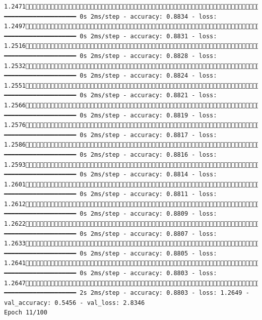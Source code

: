 \documentclass[
  letterpaper,
  DIV=11,
  numbers=noendperiod]{scrartcl}
\begin{document}
\begin{verbatim}
1.2471461/858 ━━━━━━━━━━━━━━━━━━━━ 0s 2ms/step - accuracy: 0.8834 - loss: 1.2497488/858 ━━━━━━━━━━━━━━━━━━━━ 0s 2ms/step - accuracy: 0.8831 - loss: 1.2516514/858 ━━━━━━━━━━━━━━━━━━━━ 0s 2ms/step - accuracy: 0.8828 - loss: 1.2532544/858 ━━━━━━━━━━━━━━━━━━━━ 0s 2ms/step - accuracy: 0.8824 - loss: 1.2551574/858 ━━━━━━━━━━━━━━━━━━━━ 0s 2ms/step - accuracy: 0.8821 - loss: 1.2566603/858 ━━━━━━━━━━━━━━━━━━━━ 0s 2ms/step - accuracy: 0.8819 - loss: 1.2576635/858 ━━━━━━━━━━━━━━━━━━━━ 0s 2ms/step - accuracy: 0.8817 - loss: 1.2586657/858 ━━━━━━━━━━━━━━━━━━━━ 0s 2ms/step - accuracy: 0.8816 - loss: 1.2593688/858 ━━━━━━━━━━━━━━━━━━━━ 0s 2ms/step - accuracy: 0.8814 - loss: 1.2601721/858 ━━━━━━━━━━━━━━━━━━━━ 0s 2ms/step - accuracy: 0.8811 - loss: 1.2612755/858 ━━━━━━━━━━━━━━━━━━━━ 0s 2ms/step - accuracy: 0.8809 - loss: 1.2622792/858 ━━━━━━━━━━━━━━━━━━━━ 0s 2ms/step - accuracy: 0.8807 - loss: 1.2633824/858 ━━━━━━━━━━━━━━━━━━━━ 0s 2ms/step - accuracy: 0.8805 - loss: 1.2641851/858 ━━━━━━━━━━━━━━━━━━━━ 0s 2ms/step - accuracy: 0.8803 - loss: 1.2647858/858 ━━━━━━━━━━━━━━━━━━━━ 2s 2ms/step - accuracy: 0.8803 - loss: 1.2649 - val_accuracy: 0.5456 - val_loss: 2.8346
Epoch 11/100

\end{verbatim}
\end{document}
